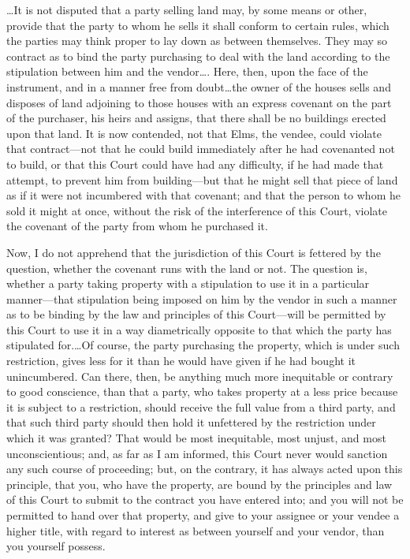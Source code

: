 \ldots It is not disputed that a party selling land may, by some means or other,
provide that the party to whom he sells it shall conform to certain rules, which
the parties may think proper to lay down as between themselves. They may so
contract as to bind the party purchasing to deal with the land according to the
stipulation between him and the vendor\ldots . Here, then, upon the face of the
instrument, and in a manner free from doubt\ldots the owner of the houses sells
and disposes of land adjoining to those houses with an express covenant on the
part of the purchaser, his heirs and assigns, that there shall be no buildings
erected upon that land. It is now contended, not that Elms, the vendee, could
violate that contract---not that he could build immediately after he had
covenanted not to build, or that this Court could have had any difficulty, if he
had made that attempt, to prevent him from building---but that he might sell
that piece of land as if it were not incumbered with that covenant; and that the
person to whom he sold it might at once, without the risk of the interference of
this Court, violate the covenant of the party from whom he purchased it.

Now, I do not apprehend that the jurisdiction of this Court is fettered by the
question, whether the covenant runs with the land or not. The question is,
whether a party taking property with a stipulation to use it in a particular
manner---that stipulation being imposed on him by the vendor in such a manner as
to be binding by the law and principles of this Court---will be permitted by
this Court to use it in a way diametrically opposite to that which the party has
stipulated for.\ldots Of course, the party purchasing the property, which is
under such restriction, gives less for it than he would have given if he had
bought it unincumbered. Can there, then, be anything much more inequitable or
contrary to good conscience, than that a party, who takes property at a less
price because it is subject to a restriction, should receive the full value from
a third party, and that such third party should then hold it unfettered by the
restriction under which it was granted? That would be most inequitable, most
unjust, and most unconscientious; and, as far as I am informed, this Court never
would sanction any such course of proceeding; but, on the contrary, it has
always acted upon this principle, that you, who have the property, are bound by
the principles and law of this Court to submit to the contract you have entered
into; and you will not be permitted to hand over that property, and give to your
assignee or your vendee a higher title, with regard to interest as between
yourself and your vendor, than you yourself possess.

